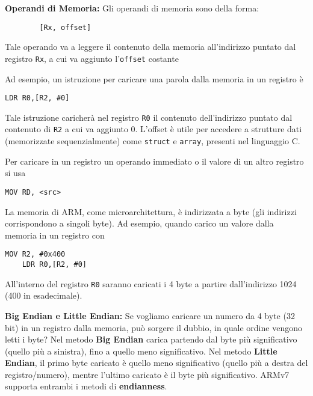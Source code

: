 \begin{defn}
	\textbf{Operandi di Memoria:}
	Gli operandi di memoria sono della forma:
	\begin{lstlisting}
		[Rx, offset]
	\end{lstlisting}
	
	Tale operando va a leggere il contenuto della memoria all'indirizzo puntato dal registro \verb|Rx|, a cui va aggiunto l'\verb|offset| costante
	
	Ad esempio, un istruzione per caricare una parola dalla memoria in un registro è 
	\begin{lstlisting}[style=arm]
	LDR R0,[R2, #0]
	\end{lstlisting}
	
	Tale istruzione caricherà nel registro \verb|R0| il contenuto dell'indirizzo puntato dal contenuto di \verb|R2| a cui va aggiunto 0. L'offset è utile per accedere a strutture dati (memorizzate sequenzialmente) come \verb|struct| e \verb|array|, presenti nel linguaggio C.

	Per caricare in un registro un operando immediato o il valore di un altro registro si usa
	\begin{lstlisting}[style=arm]
		MOV RD, <src>
	\end{lstlisting}
\end{defn}

\begin{note}
	La memoria di ARM, come microarchitettura, è indirizzata a byte (gli indirizzi corrispondono a singoli byte). Ad esempio, quando carico un valore dalla memoria in un registro con
	\begin{lstlisting}[style=arm]
	MOV R2, #0x400
	LDR R0,[R2, #0]
	\end{lstlisting}
	
	All'interno del registro \verb|R0| saranno caricati i 4 byte a partire dall'indirizzo 1024 (400 in esadecimale).
\end{note}

\begin{defn}
	\textbf{Big Endian e Little Endian:} Se vogliamo caricare un numero da 4 byte (32 bit) in un registro dalla memoria, può sorgere il dubbio, in quale ordine vengono letti i byte? Nel metodo \textbf{Big Endian} carica partendo dal byte più significativo (quello più a sinistra), fino a quello meno significativo. Nel metodo \textbf{Little Endian}, il primo byte caricato è quello meno significativo (quello più a destra del registro/numero), mentre l'ultimo caricato è il byte più significativo. ARMv7 supporta entrambi i metodi di \textbf{endianness}.
\end{defn}

